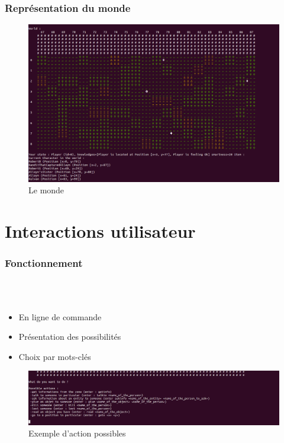 \documentclass{beamer}
\begin{document}
\begin{frame}
\frametitle{Représentation du monde}
\begin{figure}
    \begin{center}
      \includegraphics[scale=0.22]{./images/screenshootWorld.png}
      \caption{Le monde}
    \end{center}
  \end{figure}
\end{frame}


\section{Interactions utilisateur}
\begin{frame}
   \frametitle{Fonctionnement}
~\\
~\\
  \begin{itemize}
  \item En ligne de commande
  \item Présentation des possibilités
  \item Choix par mots-clés
  \end{itemize} 
\begin{figure}
    \begin{center}
      \includegraphics[scale=0.3]{./images/screenshootUI01.png}
      \caption{Exemple d'action possibles}
    \end{center}
  \end{figure}
\end{frame}
\end{document}
